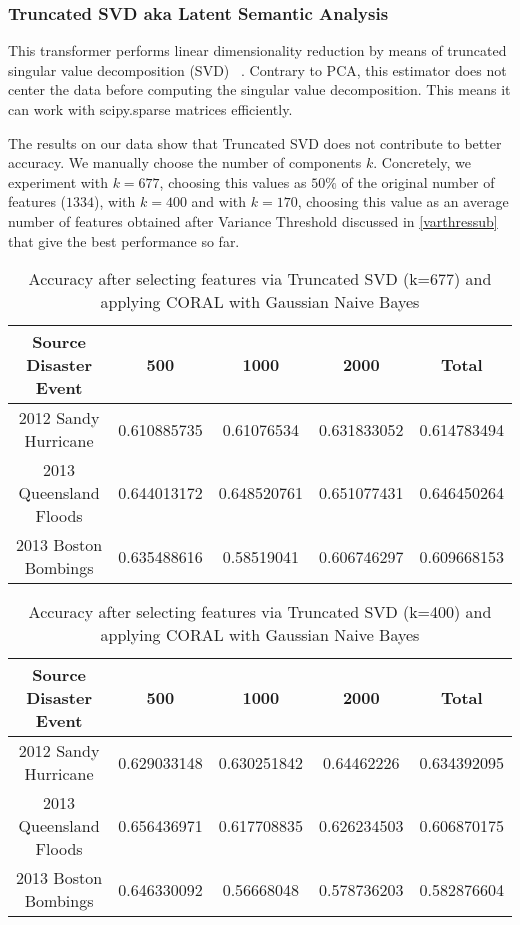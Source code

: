 \subsubsection{Truncated SVD aka Latent Semantic Analysis}

This transformer performs linear dimensionality reduction by means of truncated singular value decomposition (SVD) ~\citep{ir}. Contrary to PCA, this estimator does not center the data before computing the singular value decomposition. This means it can work with scipy.sparse matrices efficiently. 

The results on our data show that Truncated SVD does not contribute to better accuracy. We manually choose the number of components $k$. Concretely, we experiment with $k=677$, choosing this values as $50\%$ of the original number of features ($1334$), with $k=400$ and with $k=170$, choosing this value as an average number of features obtained after Variance Threshold discussed in \ref{varthressub} that give the best performance so far.

\begin{table}[!h]%
    \begin{center}
    \caption{Accuracy after selecting features via Truncated SVD (k=677) and applying CORAL with Gaussian Naive Bayes}
    \begin{tabular}[c]{|c|c|c|c|c|}
        \hline
        Source Disaster Event & 500 & 1000 & 2000 & Total \\
        \hline
        2012 Sandy Hurricane & 0.610885735 & 0.61076534 & 0.631833052 & 0.614783494 \\
        2013 Queensland Floods & 0.644013172 & 0.648520761 & 0.651077431 & 0.646450264 \\
        2013 Boston Bombings & 0.635488616 & 0.58519041 & 0.606746297 & 0.609668153 \\
        \hline
    \end{tabular}
    \label{tabletrunsvd677}
   \end{center}
\end{table}

\begin{table}[!h]%
    \begin{center}
    \caption{Accuracy after selecting features via Truncated SVD (k=400) and applying CORAL with Gaussian Naive Bayes}
    \begin{tabular}[c]{|c|c|c|c|c|}
        \hline
        Source Disaster Event & 500 & 1000 & 2000 & Total \\
        \hline
        2012 Sandy Hurricane & 0.629033148 & 0.630251842 & 0.64462226 & 0.634392095 \\
        2013 Queensland Floods & 0.656436971 & 0.617708835 & 0.626234503 & 0.606870175 \\
        2013 Boston Bombings & 0.646330092 & 0.56668048 & 0.578736203 & 0.582876604 \\
        \hline
    \end{tabular}
    \label{tabletrunsvd400}
   \end{center}
\end{table}

